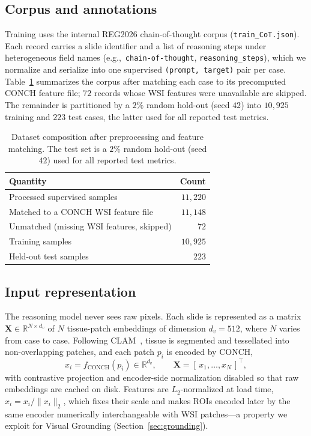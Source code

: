 \documentclass[11pt]{article}
\newcommand{\eg}{e.g.,\ }
\newcommand{\code}[1]{\texttt{\small #1}}
\newcommand{\R}{\mathbb{R}}
\newcommand{\Xbag}{\mathbf{X}}
\begin{document}
\subsection{Corpus and annotations}
Training uses the internal REG2026 chain-of-thought corpus
(\code{train\_CoT.json}). Each record carries a slide identifier and a list of
reasoning steps under heterogeneous field names (\eg \code{chain-of-thought},
\code{reasoning\_steps}), which we normalize and serialize into one supervised
\code{(prompt, target)} pair per case. Table~\ref{tab:data} summarizes the corpus
after matching each case to its precomputed CONCH feature file; $72$ records whose
WSI features were unavailable are skipped. The remainder is partitioned by a
$2\%$ random hold-out (seed $42$) into $10{,}925$ training and $223$ test cases,
the latter used for all reported test metrics.

\begin{table}[t]
\centering
\caption{Dataset composition after preprocessing and feature matching. The test
set is a $2\%$ random hold-out (seed $42$) used for all reported test metrics.}
\label{tab:data}
\begin{tabular}{lr}
\toprule
\textbf{Quantity} & \textbf{Count}\\
\midrule
Processed supervised samples              & $11{,}220$\\
Matched to a CONCH WSI feature file       & $11{,}148$\\
Unmatched (missing WSI features, skipped) & $72$\\
\midrule
Training samples                          & $10{,}925$\\
Held-out test samples                     & $223$\\
\bottomrule
\end{tabular}
\end{table}

\subsection{Input representation}
\label{sec:input}
The reasoning model never sees raw pixels. Each slide is represented as a matrix
$\Xbag\in\R^{N\times d_v}$ of $N$ tissue-patch embeddings of dimension
$d_v{=}512$, where $N$ varies from case to case. Following
CLAM~\cite{lu2021clam}, tissue is segmented and tessellated into non-overlapping
patches, and each patch $p_i$ is encoded by CONCH,
\begin{equation}
x_i = f_{\mathrm{CONCH}}(p_i)\in\R^{d_v},\qquad
\Xbag = [\,x_1,\dots,x_N\,]^\top,
\end{equation}
with contrastive projection and encoder-side normalization disabled so that raw
embeddings are cached on disk. Features are $L_2$-normalized at load time,
$\hat{x}_i = x_i/\lVert x_i\rVert_2$, which fixes their scale and makes ROIs
encoded later by the same encoder numerically interchangeable with WSI patches---a
property we exploit for Visual Grounding (Section~\ref{sec:grounding}).
\end{document}
